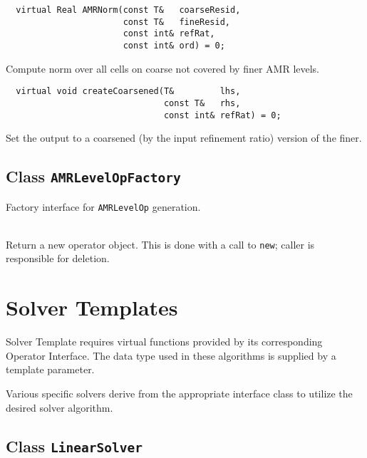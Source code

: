 \begin{itemize}
\begin{itemize}
\begin{itemize}
\begin{itemize}
\begin{itemize}
\begin{itemize}
\begin{itemize}
\begin{itemize}
\begin{itemize}
\begin{itemize}
\begin{itemize}
\I 
\begin{verbatim}
  virtual Real AMRNorm(const T&   coarseResid,
                       const T&   fineResid,
                       const int& refRat,
                       const int& ord) = 0;
\end{verbatim}
Compute norm over all cells on coarse not covered by finer AMR levels.

\I 
\begin{verbatim}
  virtual void createCoarsened(T&         lhs,
                               const T&   rhs,
                               const int& refRat) = 0;
\end{verbatim}
Set the output to a coarsened (by the input refinement ratio)
                               version of the finer.
\ei

\subsection{Class {\tt AMRLevelOpFactory}}

Factory interface for {\tt AMRLevelOp} generation.

\begin{itemize}
\\     Return a new operator object.  This is done with a call to {\tt new};
     caller is responsible for deletion.

\ei


\section{Solver Templates}

Solver Template requires virtual functions provided by its
corresponding Operator Interface.  The data type used in these
algorithms is supplied by a template parameter. 
  
Various specific solvers derive from the appropriate interface class
to utilize the desired solver algorithm.   

\subsection {Class {\tt LinearSolver}}


\end{itemize}
\end{itemize}
\end{itemize}
\end{itemize}
\end{itemize}
\end{itemize}
\end{itemize}
\end{itemize}
\end{itemize}
\end{itemize}
\end{itemize}
\end{itemize}
